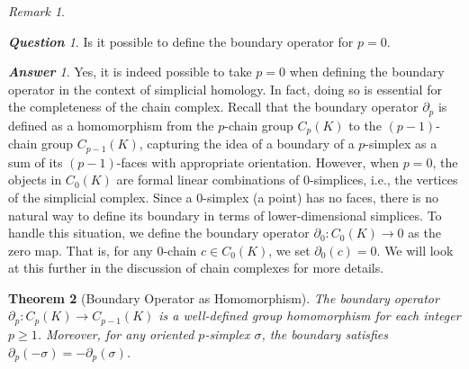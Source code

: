 \documentclass[12pt,oneside,reqno]{amsart}
\theoremstyle{plain}
\newtheorem{theorem}{Theorem}[section]
\theoremstyle{definition}
\theoremstyle{remark}
\newtheorem{remark}[theorem]{Remark}
\newtheorem{question}[]{\textbf{Question}}
\newtheorem{answer}{\textbf{Answer}}
\newcommand{\0}{{\textbf{0}}}
\begin{document}
\begin{remark}
\end{remark}

\begin{question}
Is it possible to define the boundary operator for $p = 0$. 
\end{question}

\begin{answer}
Yes, it is indeed possible to take $p = 0$ when defining the boundary operator in the context of simplicial homology. In fact, doing so is essential for the completeness of the chain complex. Recall that the boundary operator $\partial_p$ is defined as a homomorphism from the $p$-chain group $C_p(K)$ to the $(p-1)$-chain group $C_{p-1}(K)$, capturing the idea of a boundary of a $p$-simplex as a sum of its $(p-1)$-faces with appropriate orientation. However, when $p = 0$, the objects in $C_0(K)$ are formal linear combinations of $0$-simplices, i.e., the vertices of the simplicial complex. Since a $0$-simplex (a point) has no faces, there is no natural way to define its boundary in terms of lower-dimensional simplices. To handle this situation, we define the boundary operator $\partial_0 \colon C_0(K) \to 0$ as the zero map. That is, for any $0$-chain $c \in C_0(K)$, we set $\partial_0(c) = 0$. We will look at this further in the discussion of chain complexes for more details.
\end{answer}

\begin{theorem}[Boundary Operator as Homomorphism]\label{t:Boundary Operator as Homomorphism}
The boundary operator $\partial_p : C_p(K) \to C_{p-1}(K)$ is a well-defined group homomorphism for each integer $p \geq 1$. Moreover, for any oriented $p$-simplex $\sigma$, the boundary satisfies $\partial_p(-\sigma) = -\partial_p(\sigma)$.
\end{theorem}
\end{document}
